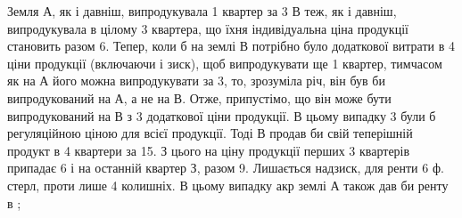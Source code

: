 Земля $А$, як і давніш, випродукувала 1 квартер за 3 $В$ теж,
як і давніш, випродукувала в цілому 3 квартера, що їхня індивідуальна ціна
продукції становить разом 6. Тепер, коли б на землі $В$ потрібно було
додаткової витрати в 4 ціни продукції (включаючи і зиск), щоб випродукувати ще 1 квартер,
тимчасом як на $А$ його можна випродукувати за
3, то, зрозуміла річ, він був би випродукований на $А$, а не на $В$.
Отже, припустімо, що він може бути випродукований на $В$ з 3
додаткової ціни продукції. В цьому випадку 3 були б регуляційною ціною
для всієї продукції. Тоді $В$ продав би свій теперішній продукт в 4  квартери за
15. З цього на ціну продукції перших 3  квартерів припадає
6 і на останній квартер З, разом 9. Лишається
надзиск, для ренти \deq{} 6  ф. стерл, проти лише 4 колишніх.
В цьому випадку акр землі $А$ також дав би ренту в  ;
\parbreak{}  %
